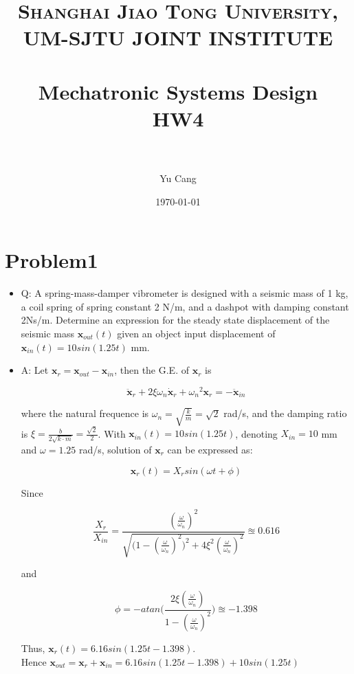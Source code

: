 \documentclass[paper=a4, fontsize=11pt]{scrartcl} %
\title{	
\normalfont \normalsize 
\textsc{Shanghai Jiao Tong University, UM-SJTU JOINT INSTITUTE} \\ [25pt] %
\horrule{0.5pt} \\[0.4cm] %
\huge Mechatronic Systems Design\\ HW4 \\ %
\horrule{2pt} \\[0.5cm] %
}
\author{Yu Cang \quad 018370210001} %
\date{\normalsize \today} %
\numberwithin{equation}{section} %
\numberwithin{figure}{section} %
\numberwithin{table}{section} %
\begin{document}
\maketitle %

\section*{Problem1}
	\begin{itemize}
		\item
			 Q: A spring-mass-damper vibrometer is designed with a seismic mass of 1 kg, a coil spring of spring constant 2 N/m, and a dashpot with damping constant 2Ns/m. Determine an expression for the steady state displacement of the seismic mass $\textbf{x}_{out}(t)$ given an object input displacement of $\textbf{x}_{in}(t)=10sin(1.25t)$ mm.
		
		\item
			 A:  Let $\textbf{x}_r = \textbf{x}_{out} - \textbf{x}_{in}$, then the G.E. of $\textbf{x}_r$ is
			 
			 \begin{equation}
			 	\ddot{\textbf{x}}_r + 2 \xi \omega_n \dot{\textbf{x}}_r + {\omega_n}^2\textbf{x}_r = -\ddot{\textbf{x}}_{in} 
			 \end{equation}
			 
			 where the natural frequence is $\omega_n = \sqrt{\frac{k}{m}} = \sqrt{2}$ rad/s, and the damping ratio is $\xi = \frac{b}{2\sqrt{k\cdot m}} = \frac{\sqrt{2}}{2}$. With $\textbf{x}_{in}(t)=10sin(1.25t)$, denoting $X_{in}= 10$ mm and $\omega = 1.25$ rad/s, solution of $\textbf{x}_r$ can be expressed as:
			 
			 \begin{equation}
			 	\textbf{x}_r(t) = X_rsin(\omega t + \phi)
			 \end{equation} 
			 
			 Since
			 
			 \begin{equation}
			 	\frac{X_r}{X_{in}} = \frac{(\frac{\omega}{\omega_n})^2}{\sqrt{\Big(1-(\frac{\omega}{\omega_n})^2\Big)^2 + 4 \xi^2  (\frac{\omega}{\omega_n})^2}} \approxeq 0.616
			 \end{equation}
			 
			 and
			 
			 \begin{equation}
				\phi = -atan\Big(\frac{2\xi(\frac{\omega}{\omega_n})}{1-(\frac{\omega}{\omega_n})^2}\Big) \approxeq -1.398
			 \end{equation}
			 
			 Thus, $\textbf{x}_r(t) = 6.16 sin(1.25t -1.398)$. \\
			 Hence $\textbf{x}_{out} = \textbf{x}_r + \textbf{x}_{in} = 6.16 sin(1.25t -1.398) + 10sin(1.25t)$
		
	\end{itemize}
\end{document}

